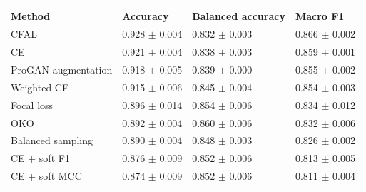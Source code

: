 \begin{tabular}{llll}
\toprule
Method & Accuracy & Balanced accuracy & Macro F1\\
\midrule
CFAL & \num{0.928} $\pm$ \num{0.004} & \num{0.832} $\pm$ \num{0.003} & \num{0.866} $\pm$ \num{0.002}\\
CE & \num{0.921} $\pm$ \num{0.004} & \num{0.838} $\pm$ \num{0.003} & \num{0.859} $\pm$ \num{0.001}\\
ProGAN augmentation & \num{0.918} $\pm$ \num{0.005} & \num{0.839} $\pm$ \num{0.000} & \num{0.855} $\pm$ \num{0.002}\\
Weighted CE & \num{0.915} $\pm$ \num{0.006} & \num{0.845} $\pm$ \num{0.004} & \num{0.854} $\pm$ \num{0.003}\\
Focal loss & \num{0.896} $\pm$ \num{0.014} & \num{0.854} $\pm$ \num{0.006} & \num{0.834} $\pm$ \num{0.012}\\
OKO & \num{0.892} $\pm$ \num{0.004} & \num{0.860} $\pm$ \num{0.006} & \num{0.832} $\pm$ \num{0.006}\\
Balanced sampling & \num{0.890} $\pm$ \num{0.004} & \num{0.848} $\pm$ \num{0.003} & \num{0.826} $\pm$ \num{0.002}\\
CE + soft F1 & \num{0.876} $\pm$ \num{0.009} & \num{0.852} $\pm$ \num{0.006} & \num{0.813} $\pm$ \num{0.005}\\
CE + soft MCC & \num{0.874} $\pm$ \num{0.009} & \num{0.852} $\pm$ \num{0.006} & \num{0.811} $\pm$ \num{0.004}\\
\bottomrule
\end{tabular}
